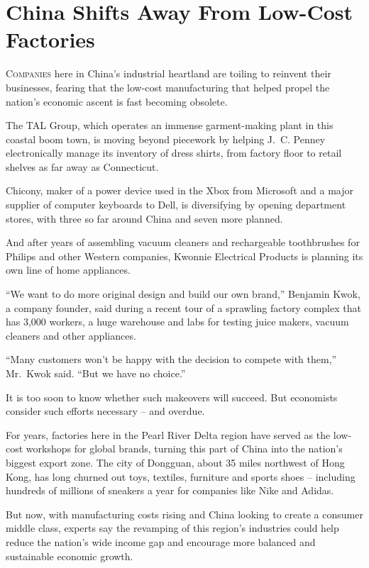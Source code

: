 ﻿\documentclass[12pt]{article}
\begin{document}
\pagebreak
\section{China Shifts Away From Low-Cost Factories}

\lettrine{C}{ompanies} here in China's industrial heartland are toiling to
reinvent their businesses, fearing that the low-cost manufacturing that helped propel the nation's
economic ascent is fast becoming obsolete.

The TAL Group, which operates an immense garment-making plant in this coastal boom town, is moving
beyond piecework by helping J.~C. Penney electronically manage its inventory of dress shirts, from
factory floor to retail shelves as far away as Connecticut.

Chicony, maker of a power device used in the Xbox from Microsoft and a major supplier of computer
keyboards to Dell, is diversifying by opening department stores, with three so far around China and
seven more planned.

And after years of assembling vacuum cleaners and rechargeable toothbrushes for Philips and other
Western companies, Kwonnie Electrical Products is planning its own line of home appliances.

``We want to do more original design and build our own brand,'' Benjamin Kwok, a company founder,
said during a recent tour of a sprawling factory complex that has 3,000 workers, a huge warehouse
and labs for testing juice makers, vacuum cleaners and other appliances.

``Many customers won't be happy with the decision to compete with them,'' Mr.~Kwok said. ``But we
have no choice.''

It is too soon to know whether such makeovers will succeed. But economists consider such efforts
necessary -- and overdue.

For years, factories here in the Pearl River Delta region have served as the low-cost workshops for
global brands, turning this part of China into the nation's biggest export zone. The city of
Dongguan, about 35 miles northwest of Hong Kong, has long churned out toys, textiles, furniture and
sports shoes -- including hundreds of millions of sneakers a year for companies like Nike and
Adidas.

But now, with manufacturing costs rising and China looking to create a consumer middle class,
experts say the revamping of this region's industries could help reduce the nation's wide income gap
and encourage more balanced and sustainable economic growth.
\end{document}
